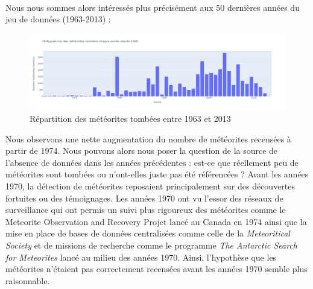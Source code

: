 \documentclass[12pt]{article}
\begin{document}
\\
Nous nous sommes alors intéressés plus précisément aux 50 dernières années du jeu de données (1963-2013) :\\
\begin{figure}[H]
\centering
\includegraphics[width=14cm]{Images/exploration/histogramme1963-2013.png}
\caption{Répartition des météorites tombées entre 1963 et 2013}
\end{figure}
Nous observons une nette augmentation du nombre de météorites recensées à partir de 1974. Nous pouvons alors nous poser la question de la source de l'absence de données dans les années précédentes : est-ce que réellement peu de météorites sont tombées ou n'ont-elles juste pas été référencées ? Avant les années 1970, la détection de météorites reposaient principalement sur des découvertes fortuites ou des témoignages. Les années 1970 ont vu l'essor des réseaux de surveillance qui ont permis un suivi plus rigoureux des météorites comme le Meteorite Observation and Recovery Projet \cite{Article_Canada_1970} lancé au Canada en 1974 ainsi que la mise en place de bases de données centralisées comme celle de la \textit{Meteoritical Society} \cite{BDD_centralisees} et de missions de recherche comme le programme \textit{The Antarctic Search for Meteorites} \cite{Mission_recherche_antartictique} lancé au milieu des années 1970. Ainsi, l'hypothèse que les météorites n'étaient pas correctement recensées avant les années 1970 semble plus raisonnable.
\end{document}
